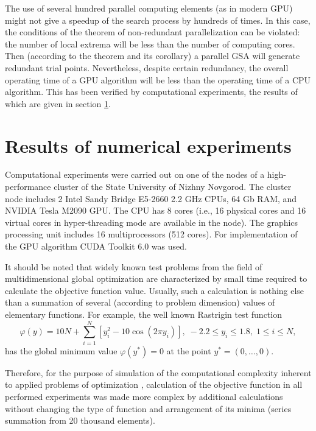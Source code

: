 \documentclass[smallcondensed]{svjour3}     %
\begin{document}
The use of several hundred parallel computing elements (as in modern GPU) might not give a speedup of the search process by hundreds of times. In this case, the conditions of the theorem of non-redundant parallelization can be violated: the number of local extrema will be less than the number of computing cores. Then (according to the theorem and its corollary) a parallel GSA will generate redundant trial points. Nevertheless, despite certain redundancy, the overall operating time of a GPU algorithm will be less than the operating time of a CPU algorithm. This has been verified by computational experiments, the results of which are given in section \ref{sec:6}.

\section{Results of numerical experiments} \label{sec:6}

Computational experiments were carried out on one of the nodes of a high-performance cluster of the State University of Nizhny Novgorod. The cluster node includes 2 Intel Sandy Bridge E5-2660 2.2 GHz CPUs, 64 Gb RAM, and NVIDIA Tesla M2090 GPU. The CPU has 8 cores (i.e., 16 physical cores and 16 virtual cores in hyper-threading mode are available in the node). The graphics processing unit includes 16 multiprocessors (512 cores). For implementation of the GPU algorithm CUDA Toolkit 6.0 was used.

It should be noted that widely known test problems from the field of multidimensional global optimization are characterized by small time required to calculate the objective function value. Usually, such a calculation is nothing else than a summation of several (according to problem dimension) values of elementary functions. For example, the well known Rastrigin test function 
\begin{equation}\label{eq:33}
\varphi(y)=10N+\sum^{N}_{i=1}\left[y^2_i-10\cos(2\pi y_i)\right], \; -2.2\leq y_i \leq 1.8, \; 1\leq i \leq N,
\end{equation}
has the global minimum value $\varphi(y^\ast)=0$ at the point $y^\ast = (0,\dots,0)$.

Therefore, for the purpose of simulation of the computational complexity inherent to applied problems of optimization \cite{RefBarkalov2013}, calculation of the objective function in all performed experiments was made more complex by additional calculations without changing the type of function and arrangement of its minima (series summation from 20 thousand elements).
\end{document}
